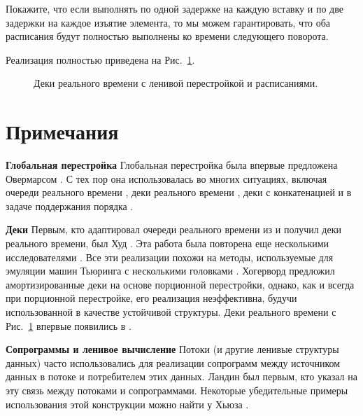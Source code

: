 \begin{exercise}\label{ex:8.7}
  Покажите, что если выполнять по одной задержке на каждую вставку и
  по две задержки на каждое изъятие элемента, то мы можем
  гарантировать, что оба расписания будут полностью выполнены ко
  времени следующего поворота.
\end{exercise}

Реализация полностью приведена на Рис.~\ref{fig:8.4}.

\begin{figure}
  \centering
  
  \caption{Деки реального времени с ленивой перестройкой и расписаниями.}
  \label{fig:8.4}
\end{figure}

\section{Примечания}
\label{sc:8.5}

\noindent
\textbf{Глобальная перестройка} Глобальная перестройка была впервые
предложена Овермарсом \cite{Overmars1983}. С тех пор она
использовалась во многих ситуациях, включая очереди реального времени
\cite{HoodMelville1981}, деки реального времени \cite{Hood1982,
  GajewskaTarjan1986, Sarnak1986, ChuangGoldberg1993}, деки с
конкатенацией \cite{BuchsbaumTarjan1995} и в задаче поддержания
порядка \cite{DietzSleator1987}.

\noindent
\textbf{Деки} Первым, кто адаптировал очереди реального времени из
\cite{HoodMelville1981} и получил деки реального времени, был Худ
\cite{Hood1982}. Эта работа была повторена еще несколькими
исследователями \cite{GajewskaTarjan1986, Sarnak1986,
  ChuangGoldberg1993}. Все эти реализации похожи на методы,
используемые для эмуляции машин Тьюринга с несколькими головками
\cite{Stoss1970, FischerMeyerRosenberg1972,
  LeongSeiferas1981}. Хогерворд \cite{Hoogerwoord1992} предложил
амортизированные деки на основе порционной перестройки, однако, как и
всегда при порционной перестройке, его реализация
неэффективна, будучи использованной в качестве устойчивой структуры. Деки
реального времени с Рис.~\ref{fig:8.4} впервые появились в
\cite{Okasaki1995c}.

\noindent
\textbf{Сопрограммы и ленивое вычисление} Потоки (и другие ленивые
структуры данных) часто использовались для реализации сопрограмм между
источником данных в потоке и потребителем этих данных. Ландин
\cite{Landin1965} был первым, кто указал на эту связь между потоками и
сопрограммами. Некоторые убедительные примеры использования этой
конструкции можно найти у Хьюза \cite{Hughes1989}.

